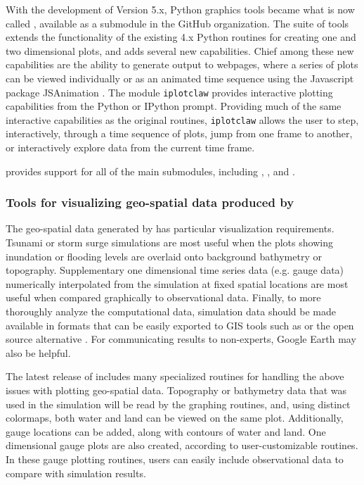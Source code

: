 With the development of \cpack Version 5.x, Python graphics tools
became what is now called \vclaw, available as a submodule in the
\cpack GitHub organization.  The \vclaw suite of tools extends the
functionality of the existing 4.x Python routines for creating one and
two dimensional plots, and adds several new capabilities.  Chief among
these new capabilities are the ability to generate output to webpages,
where a series of plots can be viewed individually or as an animated
time sequence using the Javascript package {\sc JSAnimation}
\cite{jsanimation}.  The \vclaw module {\tt iplotclaw} provides
interactive plotting capabilities from the Python or IPython prompt.
Providing much of the same interactive capabilities as the original
\mlab routines, {\tt iplotclaw} allows the user to step,
interactively, through a time sequence of plots, jump from one frame
to another, or interactively explore data from the current time frame.

\vclaw provides support for all of the main \cpack submodules, including
\cclaw, \aclaw, \pclaw and \gclaw.

\subsubsection{Tools for visualizing geo-spatial data produced by \gclaw}
The geo-spatial data generated by \gclaw has particular visualization
requirements.  Tsunami or storm surge simulations are most useful when
the plots showing inundation or flooding levels are overlaid onto
background bathymetry or topography.  Supplementary one dimensional
time series data (e.g. gauge data) numerically interpolated from
the simulation at fixed spatial locations are most useful when
compared graphically to observational data.  Finally, to more
thoroughly analyze the computational data, simulation data
should be made available in formats that can be easily exported to GIS tools
such as \agis or the open source alternative \qgis
\cite{arcgis,qgis}.  For communicating results to non-experts, Google
Earth may also be helpful.

The latest release of \cpack includes many specialized \vclaw routines
for handling the above issues with plotting geo-spatial data.
Topography or bathymetry data that was
used in the simulation will be read by the graphing routines, and,
using distinct colormaps, both water and land can be viewed on the
same plot.   Additionally, gauge locations can be added, along with contours
of water and land.  One dimensional gauge plots are also created, according to
user-customizable routines. In these gauge plotting routines,
users can easily include  observational data to compare with \gclaw
simulation results.

